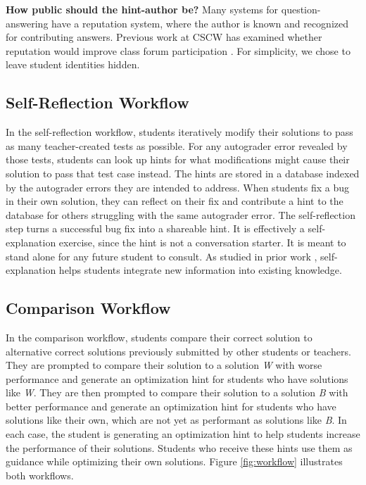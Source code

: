 {\bf How public should the hint-author be?} Many systems for question-answering have a reputation system, where the author is known and recognized for contributing answers. Previous work at CSCW has examined whether reputation would improve class forum participation \cite{reputation}. For simplicity, we chose to leave student identities hidden.

\subsection{Self-Reflection Workflow} 

In the self-reflection workflow, students iteratively modify their solutions to pass as many teacher-created tests as possible. For any autograder error revealed by those tests, students can look up hints for what modifications might cause their solution to pass that test case instead. The hints are stored in a database indexed by the autograder errors they are intended to address. When students fix a bug in their own solution, they can reflect on their fix and contribute a hint to the database for others struggling with the same autograder error. The self-reflection step turns a successful bug fix into a shareable hint. It is effectively a self-explanation exercise, since the hint is not a conversation starter. It is meant to stand alone for any future student to consult. As studied in prior work \cite{selfexplanation}, self-explanation helps students integrate new information into existing knowledge.

\subsection{Comparison Workflow} 

In the comparison workflow, students compare their correct solution to alternative correct solutions previously submitted by other students or teachers. They are prompted to compare their solution to a solution \textit{W} with worse performance and generate an optimization hint for students who have solutions like \textit{W}. They are then prompted to compare their solution to a solution \textit{B} with better performance and generate an optimization hint for students who have solutions like their own, which are not yet as performant as solutions like \textit{B}. In each case, the student is generating an optimization hint to help students increase the performance of their solutions. Students who receive these hints use them as guidance while optimizing their own solutions. Figure \ref{fig:workflow} illustrates both workflows.

